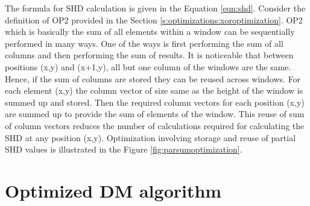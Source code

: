 The formula for SHD calculation is given in the Equation \ref{eqn:shd}. Consider the definition of OP2 provided in the Section \ref{s:optimizations:xoroptimization}. OP2 which is basically the sum of all elements within a window can be sequentially performed in many ways. One of the ways is first performing the sum of all columns and then performing the sum of results. It is noticeable that between positions (x,y) and (x+1,y), all but one column of the windows are the same. Hence, if the sum of columns are stored they can be reused across windows. For each element (x,y) the column vector of size same as the height of the window is summed up and stored. Then the required column vectors for each position (x,y) are summed up to provide the sum of elements of the window. This reuse of sum of column vectors reduces the number of calculations required for calculating the SHD at any position (x,y).  Optimization involving storage and reuse of partial SHD values is illustrated in the Figure \ref{fig:parsumoptimization}.

\section{Optimized DM algorithm}
\label{sec:optdmalgo}

